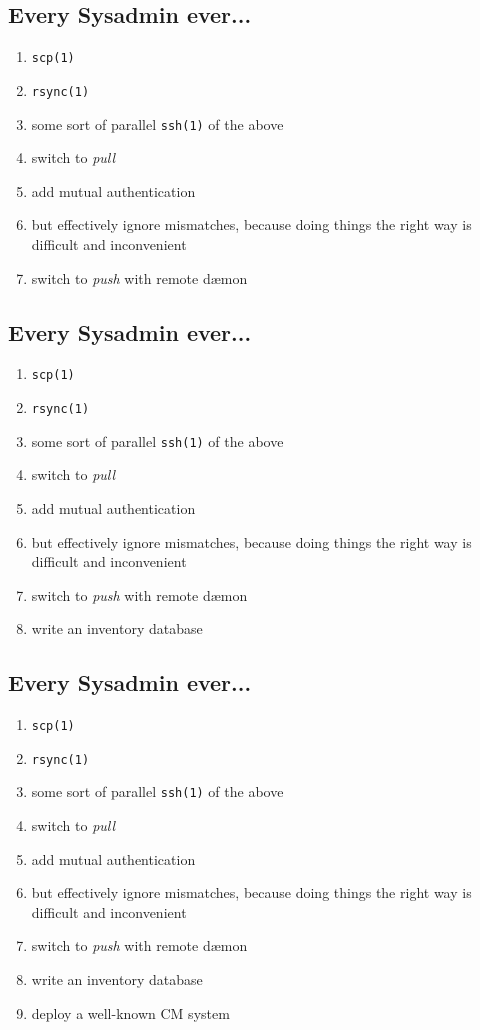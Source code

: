 \documentclass[xga]{xdvislides}
\begin{document}
\subsection{Every Sysadmin ever...}
\begin{enumerate}
	\item {\tt scp(1)}
	\item {\tt rsync(1)}
	\item some sort of parallel {\tt ssh(1)} of the above
	\item switch to {\em pull}
	\item add mutual authentication
	\item but effectively ignore mismatches, because doing things the right way is difficult and inconvenient
	\item switch to {\em push} with remote d\ae mon
\end{enumerate}

\subsection{Every Sysadmin ever...}
\begin{enumerate}
	\item {\tt scp(1)}
	\item {\tt rsync(1)}
	\item some sort of parallel {\tt ssh(1)} of the above
	\item switch to {\em pull}
	\item add mutual authentication
	\item but effectively ignore mismatches, because doing things the right way is difficult and inconvenient
	\item switch to {\em push} with remote d\ae mon
	\item write an inventory database
\end{enumerate}

\subsection{Every Sysadmin ever...}
\begin{enumerate}
	\item {\tt scp(1)}
	\item {\tt rsync(1)}
	\item some sort of parallel {\tt ssh(1)} of the above
	\item switch to {\em pull}
	\item add mutual authentication
	\item but effectively ignore mismatches, because doing things the right way is difficult and inconvenient
	\item switch to {\em push} with remote d\ae mon
	\item write an inventory database
	\item deploy a well-known CM system
\end{enumerate}
\end{document}
